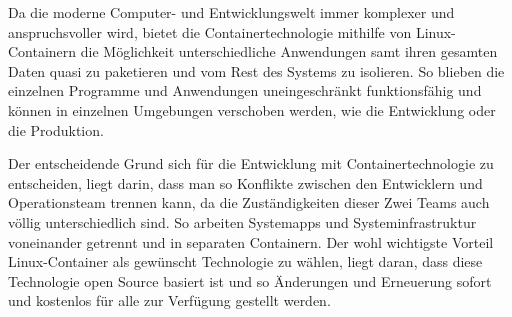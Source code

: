 
Da die moderne Computer- und Entwicklungswelt immer komplexer und anspruchsvoller wird, bietet die Containertechnologie mithilfe von Linux-Containern die Möglichkeit unterschiedliche Anwendungen samt ihren gesamten Daten quasi zu paketieren und vom Rest des Systems zu isolieren.  So blieben die einzelnen Programme und Anwendungen uneingeschränkt funktionsfähig und können in einzelnen Umgebungen verschoben werden, wie die Entwicklung oder die Produktion.

Der entscheidende Grund sich für die Entwicklung mit Containertechnologie zu entscheiden, liegt darin, dass man so Konflikte zwischen den Entwicklern und Operationsteam trennen kann, da die Zuständigkeiten dieser Zwei Teams auch völlig unterschiedlich sind. So arbeiten Systemapps und Systeminfrastruktur voneinander getrennt und in separaten Containern. Der wohl wichtigste Vorteil Linux-Container als gewünscht Technologie zu wählen, liegt daran, dass diese Technologie open Source basiert ist und so Änderungen und Erneuerung sofort und kostenlos für alle zur Verfügung gestellt werden. \cite{Container}

